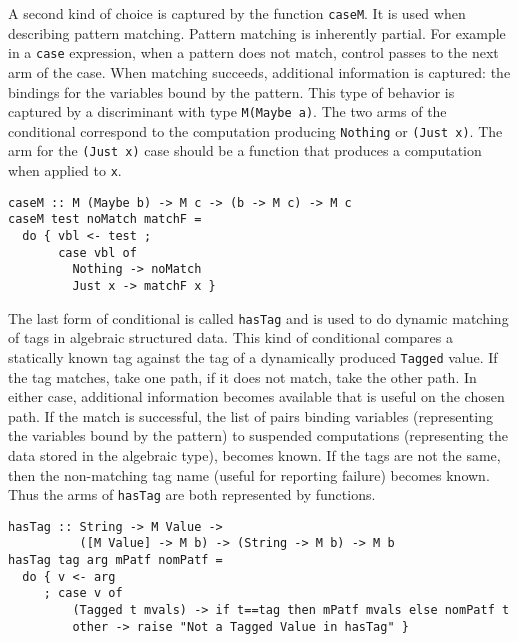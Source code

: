 \documentclass{entcs} \usepackage{entcsmacro}
\begin{document}
A second kind of choice is captured by the function {\tt caseM}. It is used when
describing pattern matching. Pattern matching is inherently partial. For example in
a {\tt case} expression, when a pattern does not match, control passes to the next
arm of the case. When matching succeeds, additional information is captured: the
bindings for the variables bound by the pattern. This type of behavior is captured
by a discriminant with type {\tt M(Maybe a)}. The two arms of the conditional
correspond to the computation producing {\tt Nothing} or {\tt (Just x)}. The arm
for the {\tt (Just x)} case should be a function that produces a computation when
applied to {\tt x}. {\small

\begin{verbatim} 
caseM :: M (Maybe b) -> M c -> (b -> M c) -> M c 
caseM test noMatch matchF = 
  do { vbl <- test ; 
       case vbl of 
         Nothing -> noMatch
         Just x -> matchF x }
\end{verbatim} }

The last form of conditional is called {\tt hasTag} and is used to do dynamic
matching of tags in algebraic structured data. This kind of conditional compares a
statically known tag against the tag of a dynamically produced {\tt Tagged} value.
If the tag matches, take one path, if it does not match, take the other path. In
either case, additional information becomes available that is useful on the chosen
path. If the match is successful, the list of pairs binding variables
(representing the variables bound by the pattern) to suspended computations
(representing the data stored in the algebraic type), becomes known. If the tags
are not the same, then the non-matching tag name (useful for reporting failure)
becomes known. Thus the arms of {\tt hasTag} are both represented by functions.

{\small
\begin{verbatim}     
hasTag :: String -> M Value -> 
          ([M Value] -> M b) -> (String -> M b) -> M b     
hasTag tag arg mPatf nomPatf =
  do { v <- arg
     ; case v of
         (Tagged t mvals) -> if t==tag then mPatf mvals else nomPatf t
         other -> raise "Not a Tagged Value in hasTag" }
\end{verbatim}
}
\end{document}
